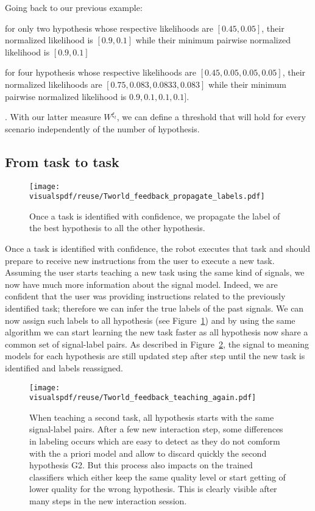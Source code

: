 Going back to our previous example: \begin{inparaenum}[a)] \item for only two hypothesis whose respective likelihoods are $[0.45, 0.05]$, their normalized likelihood is $[0.9,0.1]$ while their minimum pairwise normalized likelihood is $[0.9, 0.1]$ \item for four hypothesis whose respective likelihoods are $[0.45, 0.05, 0.05, 0.05]$, their normalized likelihoods are $[0.75, 0.083, 0.0833, 0.083]$ while their minimum pairwise normalized likelihood is $0.9, 0.1, 0.1, 0.1]$. \end{inparaenum}. With our latter measure $W^{\xi_t}$, we can define a threshold that will hold for every scenario independently of the number of hypothesis. 

\subsection{From task to task}
\label{chapter:lfui:tasttotask}

\begin{figure}[!ht]
  \centering
  \texttt{[image: \\visualspdf/reuse/Tworld\_feedback\_propagate\_labels.pdf]}
  \caption{Once a task is identified with confidence, we propagate the label of the best hypothesis to all the other hypothesis.}
  \label{fig:TworldPropagate}
\end{figure}

Once a task is identified with confidence, the robot executes that task and should prepare to receive new instructions from the user to execute a new task. Assuming the user starts teaching a new task using the same kind of signals, we now have much more information about the signal model. Indeed, we are confident that the user was providing instructions related to the previously identified task; therefore we can infer the true labels of the past signals. We can now  assign such labels to all hypothesis (see Figure~\ref{fig:TworldPropagate}) and by using the same algorithm we can start learning the new task faster as all hypothesis now share a common set of signal-label pairs. As described in Figure~\ref{fig:TworldReuse}, the signal to meaning models for each hypothesis are still updated step after step until the new task is identified and labels reassigned.


\begin{figure}[!ht]
  \centering
  \texttt{[image: \\visualspdf/reuse/Tworld\_feedback\_teaching\_again.pdf]}
  \caption{When teaching a second task, all hypothesis starts with the same signal-label pairs. After a few new interaction step, some differences in labeling occurs which are easy to detect as they do not comform with the a priori model and allow to discard quickly the second hypothesis G2. But this process also impacts on the trained classifiers which either keep the same quality level or start getting of lower quality for the wrong hypothesis. This is clearly visible after many steps in the new interaction session.}
  \label{fig:TworldReuse}
\end{figure}

